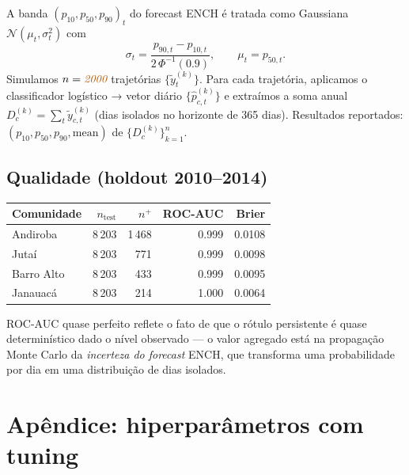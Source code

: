 \documentclass[10pt,a4paper]{article}
\newcommand{\tune}[1]{\textcolor{orange!70!black}{\textit{#1}}}
\begin{document}
A banda $(p_{10}, p_{50}, p_{90})_t$ do forecast ENCH é tratada como Gaussiana
$\mathcal{N}(\mu_t, \sigma_t^2)$ com
\begin{equation}
  \sigma_t = \frac{p_{90,t} - p_{10,t}}{2\,\Phi^{-1}(0{.}9)}, \qquad \mu_t = p_{50,t}.
\end{equation}
Simulamos $n=\tune{2000}$ trajetórias $\{\tilde{y}_t^{(k)}\}$. Para cada
trajetória, aplicamos o classificador logístico → vetor diário
$\{\hat{p}_{c,t}^{(k)}\}$ e extraímos a soma anual $D_c^{(k)} = \sum_t \tilde{y}_{c,t}^{(k)}$
(dias isolados no horizonte de 365 dias). Resultados reportados: $(p_{10},
p_{50}, p_{90}, \text{mean})$ de $\{D_c^{(k)}\}_{k=1}^{n}$.

\subsection*{Qualidade (holdout 2010–2014)}

\begin{center}
\small
\begin{tabular}{lrrrr}
\toprule
Comunidade & $n_{\text{test}}$ & $n^+$ & ROC-AUC & Brier \\
\midrule
Andiroba    & 8\,203 & 1\,468 & 0.999 & 0.0108 \\
Jutaí       & 8\,203 & 771    & 0.999 & 0.0098 \\
Barro Alto  & 8\,203 & 433    & 0.999 & 0.0095 \\
Janauacá    & 8\,203 & 214    & 1.000 & 0.0064 \\
\bottomrule
\end{tabular}
\end{center}

ROC-AUC quase perfeito reflete o fato de que o rótulo persistente é quase
determinístico dado o nível observado --- o valor agregado está na propagação
Monte Carlo da \emph{incerteza do forecast} ENCH, que transforma uma
probabilidade por dia em uma distribuição de dias isolados.

\section*{Apêndice: hiperparâmetros com tuning}
\end{document}
